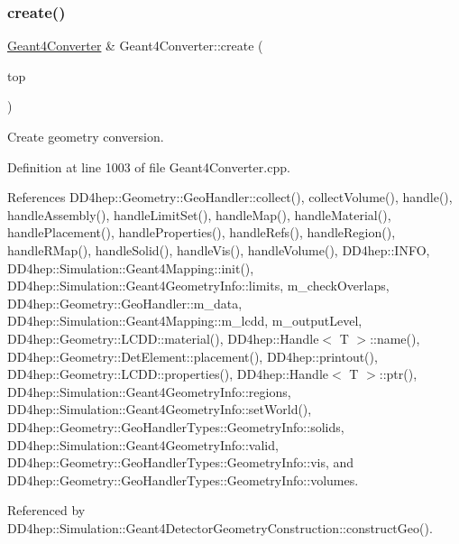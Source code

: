 \subsubsection{\texorpdfstring{create()}{create()}}
{\footnotesize\ttfamily \hyperlink{class_d_d4hep_1_1_simulation_1_1_geant4_converter}{Geant4\+Converter} \& Geant4\+Converter\+::create (\begin{DoxyParamCaption}\item[{\hyperlink{class_d_d4hep_1_1_simulation_1_1_geant4_mapping_a58a1cf6fc60a0928c1048fb1d32fcea5}{Det\+Element}}]{top }\end{DoxyParamCaption})}



Create geometry conversion. 



Definition at line 1003 of file Geant4\+Converter.\+cpp.



References D\+D4hep\+::\+Geometry\+::\+Geo\+Handler\+::collect(), collect\+Volume(), handle(), handle\+Assembly(), handle\+Limit\+Set(), handle\+Map(), handle\+Material(), handle\+Placement(), handle\+Properties(), handle\+Refs(), handle\+Region(), handle\+R\+Map(), handle\+Solid(), handle\+Vis(), handle\+Volume(), D\+D4hep\+::\+I\+N\+FO, D\+D4hep\+::\+Simulation\+::\+Geant4\+Mapping\+::init(), D\+D4hep\+::\+Simulation\+::\+Geant4\+Geometry\+Info\+::limits, m\+\_\+check\+Overlaps, D\+D4hep\+::\+Geometry\+::\+Geo\+Handler\+::m\+\_\+data, D\+D4hep\+::\+Simulation\+::\+Geant4\+Mapping\+::m\+\_\+lcdd, m\+\_\+output\+Level, D\+D4hep\+::\+Geometry\+::\+L\+C\+D\+D\+::material(), D\+D4hep\+::\+Handle$<$ T $>$\+::name(), D\+D4hep\+::\+Geometry\+::\+Det\+Element\+::placement(), D\+D4hep\+::printout(), D\+D4hep\+::\+Geometry\+::\+L\+C\+D\+D\+::properties(), D\+D4hep\+::\+Handle$<$ T $>$\+::ptr(), D\+D4hep\+::\+Simulation\+::\+Geant4\+Geometry\+Info\+::regions, D\+D4hep\+::\+Simulation\+::\+Geant4\+Geometry\+Info\+::set\+World(), D\+D4hep\+::\+Geometry\+::\+Geo\+Handler\+Types\+::\+Geometry\+Info\+::solids, D\+D4hep\+::\+Simulation\+::\+Geant4\+Geometry\+Info\+::valid, D\+D4hep\+::\+Geometry\+::\+Geo\+Handler\+Types\+::\+Geometry\+Info\+::vis, and D\+D4hep\+::\+Geometry\+::\+Geo\+Handler\+Types\+::\+Geometry\+Info\+::volumes.



Referenced by D\+D4hep\+::\+Simulation\+::\+Geant4\+Detector\+Geometry\+Construction\+::construct\+Geo().

\hypertarget{class_d_d4hep_1_1_simulation_1_1_geant4_converter_a5fca0452705b0ab14007744f15458694}{}\label{class_d_d4hep_1_1_simulation_1_1_geant4_converter_a5fca0452705b0ab14007744f15458694} 

